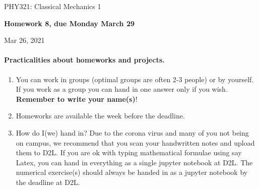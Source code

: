 \documentclass[%
oneside,                 %
final,                   %
10pt]{article}
\begin{document}

\newcommand{\exercisesection}[1]{\subsection*{#1}}






\thispagestyle{empty}

\begin{center}
{\LARGE\bf
\begin{spacing}{1.25}
PHY321: Classical Mechanics 1
\end{spacing}
}
\end{center}


\begin{center}
{\bf Homework 8, due Monday  March 29${}^{}$} \\ [0mm]
\end{center}

\begin{center}
\end{center}
    

\begin{center}
Mar 26, 2021
\end{center}

\vspace{1cm}


\paragraph{Practicalities about  homeworks and projects.}
\begin{enumerate}
\item You can work in groups (optimal groups are often 2-3 people) or by yourself. If you work as a group you can hand in one answer only if you wish. \textbf{Remember to write your name(s)}!

\item Homeworks are available  the week before the deadline. 

\item How do I(we)  hand in?  Due to the corona virus and many of you not being on campus, we recommend that you scan your handwritten notes and upload them to D2L. If you are ok with typing mathematical formulae using say Latex, you can hand in everything as a single jupyter notebook at D2L. The numerical exercise(s) should always be handed in as a jupyter notebook by the deadline at D2L. 
\end{enumerate}
\end{document}
